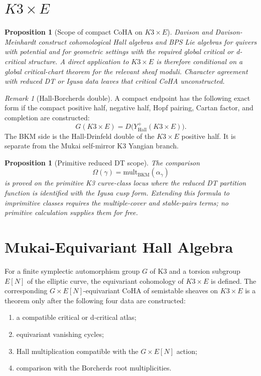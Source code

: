 \documentclass[11pt]{article}
\newtheorem{proposition}[theorem]{Proposition}
\theoremstyle{definition}
\theoremstyle{remark}
\newtheorem{remark}[theorem]{Remark}
\begin{document}
\section{$K3\times E$}
\label{sec:k3e}

\begin{proposition}[Scope of compact CoHA on $K3\times E$]
\label{prop:k3e-coha-scope}
Davison and Davison-Meinhardt construct cohomological Hall algebras and
BPS Lie algebras for quivers with potential and for geometric settings
with the required global critical or d-critical structure. A direct
application to $K3\times E$ is therefore conditional on a global
critical-chart theorem for the relevant sheaf moduli. Character
agreement with reduced DT or Igusa data leaves that critical CoHA
unconstructed.
\end{proposition}

\begin{remark}[Hall-Borcherds double]
A compact endpoint has the following exact form if the compact positive
half, negative half, Hopf pairing, Cartan factor, and completion are
constructed:
\[
 G(K3\times E)=D\bigl(Y^+_{\mathrm{Hall}}(K3\times E)\bigr).
\]
The BKM side is the Hall-Drinfeld double of the $K3\times E$ positive
half. It is separate from the Mukai self-mirror K3 Yangian branch.
\end{remark}

\begin{proposition}[Primitive reduced DT scope]
\label{prop:primitive-scope}
The comparison
\[
 \Omega(\gamma)=\mathrm{mult}_{\mathrm{BKM}}(\alpha_\gamma)
\]
is proved on the primitive K3 curve-class locus where the reduced DT
partition function is identified with the Igusa cusp form. Extending
this formula to imprimitive classes requires the multiple-cover and
stable-pairs terms; no primitive calculation supplies them for free.
\end{proposition}

\section{Mukai-Equivariant Hall Algebra}
\label{sec:mukai-equivariant}

For a finite symplectic automorphism group $G$ of K3 and a torsion
subgroup $E[N]$ of the elliptic curve, the equivariant cohomology of
$K3\times E$ is defined. The corresponding
$G\times E[N]$-equivariant CoHA of semistable sheaves on $K3\times E$
is a theorem only after the following four data are constructed:
\begin{enumerate}
\item a compatible critical or d-critical atlas;
\item equivariant vanishing cycles;
\item Hall multiplication compatible with the $G\times E[N]$ action;
\item comparison with the Borcherds root multiplicities.
\end{enumerate}
\end{document}
